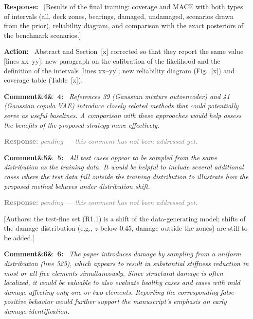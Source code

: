 \documentclass[11pt]{article}
\newenvironment{rcomment}[1]{\par\bigskip\noindent\textbf{Comment\ifx&#1&\else\ #1\fi:}\ \itshape}{\par}
\newenvironment{response}{\par\smallskip\noindent\color{resp}\textbf{Response:}\ }{\par}
\newenvironment{action}{\par\smallskip\noindent\color{resp}\textbf{Action:}\ }{\par}
\newcommand{\pending}{\par\smallskip\noindent\textcolor{gray}{\textbf{Response:} \textit{pending --- this comment
has not been addressed yet.}}\par}
\newcommand{\authornote}[1]{\textcolor{note}{\textsf{[Authors: #1]}}}
\newcommand{\tbd}[1]{\textcolor{note}{\textsf{[#1]}}}
\newcommand{\lines}[1]{\tbd{lines #1}}
\begin{document}
\begin{response}
\tbd{Results of the final training: coverage and MACE with both types of intervals (all, deck zones, bearings,
damaged, undamaged, scenarios drawn from the prior), reliability diagram, and comparison with the exact posteriors of
the benchmark scenarios.}
\end{response}

\begin{action}
Abstract and Section~\tbd{x} corrected so that they report the same value \lines{xx--yy}; new paragraph on the
calibration of the likelihood and the definition of the intervals \lines{xx--yy}; new reliability diagram (Fig.~\tbd{x})
and coverage table (Table~\tbd{x}).
\end{action}

\begin{rcomment}{4}
References 39 (Gaussian mixture autoencoder) and 41 (Gaussian copula VAE) introduce closely related methods that could
potentially serve as useful baselines. A comparison with these approaches would help assess the benefits of the proposed
strategy more effectively.
\end{rcomment}
\pending

\begin{rcomment}{5}
All test cases appear to be sampled from the same distribution as the training data. It would be helpful to include
several additional cases where the test data fall outside the training distribution to illustrate how the proposed
method behaves under distribution shift.
\end{rcomment}
\pending
\authornote{the test-fine set (R1.1) is a shift of the data-generating model; shifts of the damage distribution (e.g.,
$z$ below 0.45, damage outside the zones) are still to be added.}

\begin{rcomment}{6}
The paper introduces damage by sampling from a uniform distribution (line 323), which appears to result in substantial
stiffness reduction in most or all five elements simultaneously. Since structural damage is often localized, it would be
valuable to also evaluate healthy cases and cases with mild damage affecting only one or two elements. Reporting the
corresponding false-positive behavior would further support the manuscript's emphasis on early damage identification.
\end{rcomment}
\end{document}
